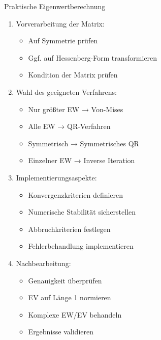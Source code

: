 \begin{KR}{Praktische Eigenwertberechnung}
\begin{enumerate}
    \item Vorverarbeitung der Matrix:
    \begin{itemize}
        \item Auf Symmetrie prüfen
        \item Ggf. auf Hessenberg-Form transformieren
        \item Kondition der Matrix prüfen
    \end{itemize}
    
    \item Wahl des geeigneten Verfahrens:
    \begin{itemize}
        \item Nur größter EW → Von-Mises
        \item Alle EW → QR-Verfahren
        \item Symmetrisch → Symmetrisches QR
        \item Einzelner EW → Inverse Iteration
    \end{itemize}
    
    \item Implementierungsaspekte:
    \begin{itemize}
        \item Konvergenzkriterien definieren
        \item Numerische Stabilität sicherstellen
        \item Abbruchkriterien festlegen
        \item Fehlerbehandlung implementieren
    \end{itemize}
    
    \item Nachbearbeitung:
    \begin{itemize}
        \item Genauigkeit überprüfen
        \item EV auf Länge 1 normieren
        \item Komplexe EW/EV behandeln
        \item Ergebnisse validieren
    \end{itemize}
\end{enumerate}
\end{KR}

